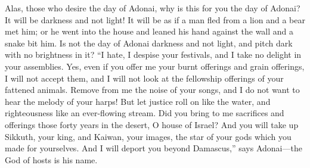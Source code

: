 \begin{biblechapter}
 Alas, those who desire the day of Adonai, why is this for you the day of Adonai? It will be darkness and not light!
\verse It will be as if a man fled from a lion and a bear met him; or he went into the house and leaned his hand against the wall and a snake bit him.
\verse Is not the day of Adonai darkness and not light, and pitch dark with no brightness in it?
\verse “I hate, I despise your festivals, and I take no delight in your assemblies.
\verse Yes, even if you offer me your burnt offerings and grain offerings, I will not accept them, and I will not look at the fellowship offerings of your fattened animals.
\verse Remove from me the noise of your songs, and I do not want to hear the melody of your harps!
\verse But let justice roll on like the water, and righteousness like an ever-flowing stream.
\verse Did you bring to me sacrifices and offerings those forty years in the desert, O house of Israel?
\verse And you will take up Sikkuth, your king, and Kaiwan, your images, the star of your gods which you made for yourselves.
\verse And I will deport you beyond Damascus,” says Adonai—the God of hosts is his name.
\end{biblechapter}

